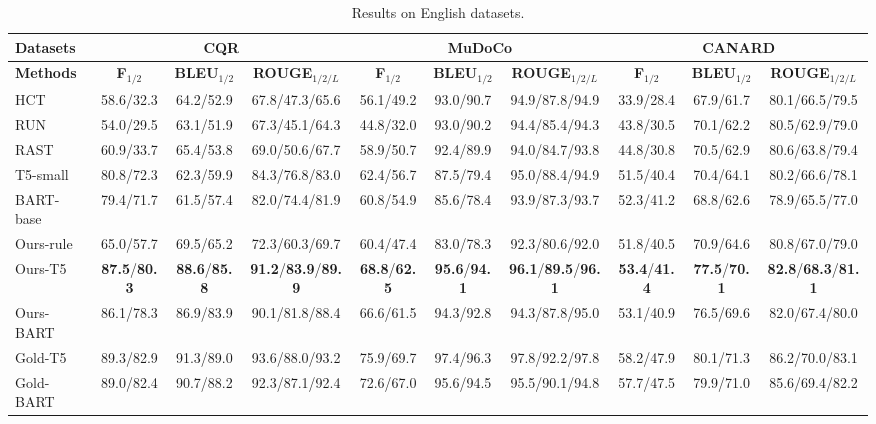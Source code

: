\begin{table}[ht!]
\centering
\scriptsize
\begin{tabular}{l|ccc|ccc|ccc}
\toprule
\textbf{Datasets} & \multicolumn{3}{c|}{CQR} &\multicolumn{3}{c|}{MuDoCo} &\multicolumn{3}{c}{CANARD} \\ \midrule
\textbf{Methods}&    \textbf{F}$_{1/2}$ & \textbf{BLEU}$_{1/2}$ & \textbf{ROUGE}$_{1/2/L}$&    \textbf{F}$_{1/2}$ & \textbf{BLEU}$_{1/2}$ & \textbf{ROUGE}$_{1/2/L}$ &    \textbf{F}$_{1/2}$ & \textbf{BLEU}$_{1/2}$ & \textbf{ROUGE}$_{1/2/L}$  \\ \midrule
HCT    & 58.6/32.3 & 64.2/52.9  & 67.8/47.3/65.6 & 56.1/49.2 & 93.0/90.7  & 94.9/87.8/94.9  & 33.9/28.4 & 67.9/61.7  & 80.1/66.5/79.5 \\
RUN    & 54.0/29.5 & 63.1/51.9  & 67.3/45.1/64.3 & 44.8/32.0 & 93.0/90.2  & 94.4/85.4/94.3  & 43.8/30.5 & 70.1/62.2  & 80.5/62.9/79.0 \\
RAST    & 60.9/33.7 & 65.4/53.8  & 69.0/50.6/67.7  & 58.9/50.7 & 92.4/89.9  & 94.0/84.7/93.8 & 44.8/30.8 & 70.5/62.9  & 80.6/63.8/79.4  \\
T5-small & 80.8/72.3 & 62.3/59.9 & 84.3/76.8/83.0  & 62.4/56.7 & 87.5/79.4 & 95.0/88.4/94.9  & 51.5/40.4 & 70.4/64.1  & 80.2/66.6/78.1 \\
BART-base & 79.4/71.7 & 61.5/57.4 & 82.0/74.4/81.9  & 60.8/54.9 & 85.6/78.4 & 93.9/87.3/93.7  & 52.3/41.2 & 68.8/62.6  & 78.9/65.5/77.0 \\
Ours-rule  & 65.0/57.7 & 69.5/65.2 & 72.3/60.3/69.7  & 60.4/47.4 & 83.0/78.3  & 92.3/80.6/92.0 & 51.8/40.5 & 70.9/64.6  & 80.8/67.0/79.0  \\
Ours-T5   & \textbf{87.5}/\textbf{80.3} & \textbf{88.6}/\textbf{85.8} & \textbf{91.2}/\textbf{83.9}/\textbf{89.9} & \textbf{68.8}/\textbf{62.5} & \textbf{95.6}/\textbf{94.1} & \textbf{96.1}/\textbf{89.5}/\textbf{96.1}  & \textbf{53.4}/\textbf{41.4} & \textbf{77.5}/\textbf{70.1}  & \textbf{82.8}/\textbf{68.3}/\textbf{81.1} \\
Ours-BART   & 86.1/78.3 & 86.9/83.9 & 90.1/81.8/88.4 & 66.6/61.5 & 94.3/92.8 & 94.3/87.8/95.0  & 53.1/40.9 & 76.5/69.6  & 82.0/67.4/80.0 \\ \midrule
Gold-T5  & 89.3/82.9 & 91.3/89.0 & 93.6/88.0/93.2  & 75.9/69.7 & 97.4/96.3 & 97.8/92.2/97.8  & 58.2/47.9 & 80.1/71.3  & 86.2/70.0/83.1\\
Gold-BART &89.0/82.4& 90.7/88.2 & 92.3/87.1/92.4  &72.6/67.0 & 95.6/94.5 & 95.5/90.1/94.8  & 57.7/47.5 & 79.9/71.0  & 85.6/69.4/82.2  \\
\bottomrule
\end{tabular}
\caption{Results on English datasets.}
\label{tab:english-result}
\end{table}

